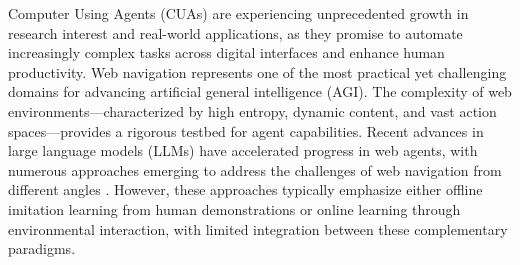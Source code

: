 \documentclass{article}
\begin{document}
Computer Using Agents (CUAs) \citep{cua2025} are experiencing unprecedented growth in research interest and real-world applications, as they promise to automate increasingly complex tasks across digital interfaces and enhance human productivity. Web navigation represents one of the most practical yet challenging domains for advancing artificial general intelligence (AGI). The complexity of web environments—characterized by high entropy, dynamic content, and vast action spaces—provides a rigorous testbed for agent capabilities. Recent advances in large language models (LLMs) have accelerated progress in web agents, with numerous approaches emerging to address the challenges of web navigation from different angles \citep{zhou2023webarena,deng2023mind2web,gur2023real,zhang2025webpilot,lu2024weblinx}. However, these approaches typically emphasize either offline imitation learning from human demonstrations or online learning through environmental interaction, with limited integration between these complementary paradigms.
\end{document}
